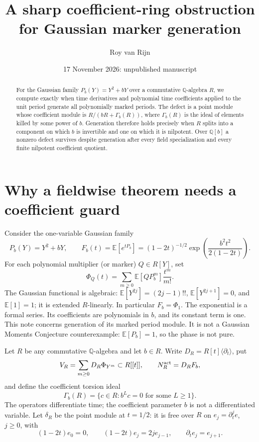 \documentclass[11pt]{article}
\title{A sharp coefficient-ring obstruction\\for Gaussian marker generation}
\author{Roy van Rijn}\date{17 November 2026: unpublished manuscript}
\theoremstyle{definition}\newtheorem{definition}[theorem]{Definition}
\theoremstyle{remark}\newtheorem{remark}[theorem]{Remark}
\newcommand{\E}{\mathbb E}
\begin{document}
\maketitle

\begin{abstract}
For the Gaussian family $P_b(Y)=Y^2+bY$ over a commutative
$\mathbb Q$-algebra $R$, we compute exactly when time derivatives
and polynomial time coefficients applied to the unit period generate
all polynomially marked periods. The defect is a point module whose
coefficient module is $R/(bR+\Gamma_b(R))$, where $\Gamma_b(R)$ is
the ideal of elements killed by some power of $b$. Generation therefore
holds precisely when $R$ splits into a component on which $b$ is
invertible and one on which it is nilpotent. Over $\mathbb Q[b]$ a
nonzero defect survives despite generation after every field
specialization and every finite nilpotent coefficient quotient.
\end{abstract}

\section{Why a fieldwise theorem needs a coefficient guard}

Consider the one-variable Gaussian family
\[
 P_b(Y)=Y^2+bY,\qquad
 F_b(t)=\E[e^{tP_b}]
   =(1-2t)^{-1/2}\exp\!\left(\frac{b^2t^2}{2(1-2t)}\right).
\]
For each polynomial multiplier (or marker) $Q\in R[Y]$, set
\[
 \Phi_Q(t)=\sum_{m\ge0}\E[QP_b^m]\frac{t^m}{m!}.
\]
The Gaussian functional is algebraic:
$\E[Y^{2j}]=(2j-1)!!$, $\E[Y^{2j+1}]=0$, and $\E[1]=1$;
it is extended $R$-linearly. In particular $F_b=\Phi_1$.
The exponential is a formal series. Its coefficients are polynomials
in $b$, and its constant term is one. This note concerns generation
of its marked period module. It is not a Gaussian Moments Conjecture
counterexample: $\E[P_b]=1$, so the phase is not pure.

Let $R$ be any commutative $\mathbb Q$-algebra and let $b\in R$.
Write $D_R=R[t]\langle\partial_t\rangle$, put
\[
 V_R=\sum_{m\ge0}D_R\Phi_{Y^m}\subset R[[t]],\qquad
 N_R^{\rm act}=D_RF_b,
\]
and define the coefficient torsion ideal
\[
 \Gamma_b(R)=\{c\in R:b^Lc=0\text{ for some }L\ge1\}.
\]
The operators differentiate time; the coefficient parameter $b$
is not a differentiated variable.
Let $\delta_R$ be the point module at $t=1/2$: it is free over
$R$ on $e_j=\partial_t^j e$, $j\ge0$, with
\[
 (1-2t)e_0=0,\qquad
 (1-2t)e_j=2j e_{j-1},\qquad\partial_t e_j=e_{j+1}.
\]
\end{document}
